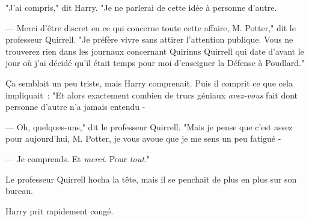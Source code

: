 "J'ai compris," dit Harry. "Je ne parlerai de cette idée à personne d'autre.

--- Merci d'être discret en ce qui concerne toute cette affaire, M. Potter," dit le professeur Quirrell. "Je préfère vivre sans attirer l'attention publique. Vous ne trouverez rien dans les journaux concernant Quirinus Quirrell qui date d'avant le jour où j'ai décidé qu'il était temps pour moi d'enseigner la Défense à Poudlard."

Ça semblait un peu triste, mais Harry comprenait. Puis il comprit ce que cela impliquait~: "Et alors exactement combien de trucs géniaux \emph{avez-vous} fait dont personne d'autre n'a jamais entendu -

--- Oh, quelques-uns," dit le professeur Quirrell. "Mais je pense que c'est assez pour aujourd'hui, M. Potter, je vous avoue que je me sens un peu fatigué -

--- Je comprends. Et \emph{merci}. Pour \emph{tout}."

Le professeur Quirrell hocha la tête, mais il se penchait de plus en plus sur son bureau.

Harry prit rapidement congé.~ 


